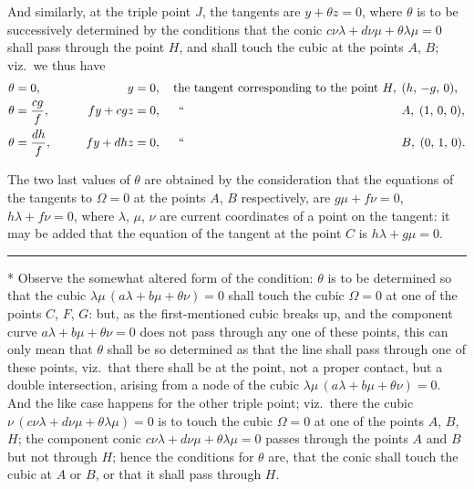 \documentclass[12pt,a4paper]{article}
\begin{document}
And similarly, at the triple point $J$, the tangents are $y+\theta z=0$, where $\theta$ is to be successively determined by the conditions that the conic $c\nu\lambda+d\nu\mu+\theta\lambda\mu=0$ shall pass through the point $H$, and shall touch the cubic at the points $A$, $B$; viz.\ we thus have
\begin{alignat*}{3}
\theta &= 0, &\qquad y &= 0, \quad \text{the tangent corresponding to the point } H,\; (h,\,-g,\,0), \\
\theta &= \frac{cg}{f}, &\qquad fy+cgz &= 0, \quad\;\, \text{``\quad\quad\quad\quad\quad\quad\quad\quad\quad\quad\quad\quad\quad\quad\quad\quad\quad\quad} A,\; (1,\,0,\,0), \\
\theta &= \frac{dh}{f}, &\qquad fy+dhz &= 0, \quad\;\, \text{``\quad\quad\quad\quad\quad\quad\quad\quad\quad\quad\quad\quad\quad\quad\quad\quad\quad\quad} B,\; (0,\,1,\,0).
\end{alignat*}

The two last values of $\theta$ are obtained by the consideration that the equations of the tangents to $\Omega=0$ at the points $A$, $B$ respectively, are $g\mu+f\nu=0$, $h\lambda+f\nu=0$, where $\lambda$, $\mu$, $\nu$ are current coordinates of a point on the tangent: it may be added that the equation of the tangent at the point $C$ is $h\lambda+g\mu=0$.

\vspace{1ex}
\noindent\rule{2em}{0.4pt}
\begin{flushleft}
\small
* Observe the somewhat altered form of the condition: $\theta$ is to be determined so that the cubic $\lambda\mu\,(a\lambda+b\mu+\theta\nu)=0$ shall touch the cubic $\Omega=0$ at one of the points $C$, $F$, $G$: but, as the first-mentioned cubic breaks up, and the component curve $a\lambda+b\mu+\theta\nu=0$ does not pass through any one of these points, this can only mean that $\theta$ shall be so determined as that the line shall pass through one of these points, viz.\ that there shall be at the point, not a proper contact, but a double intersection, arising from a node of the cubic $\lambda\mu\,(a\lambda+b\mu+\theta\nu)=0$. And the like case happens for the other triple point; viz.\ there the cubic $\nu\,(c\nu\lambda+d\nu\mu+\theta\lambda\mu)=0$ is to touch the cubic $\Omega=0$ at one of the points $A$, $B$, $H$; the component conic $c\nu\lambda+d\nu\mu+\theta\lambda\mu=0$ passes through the points $A$ and $B$ but not through $H$; hence the conditions for $\theta$ are, that the conic shall touch the cubic at $A$ or $B$, or that it shall pass through $H$.
\end{flushleft}
\end{document}
